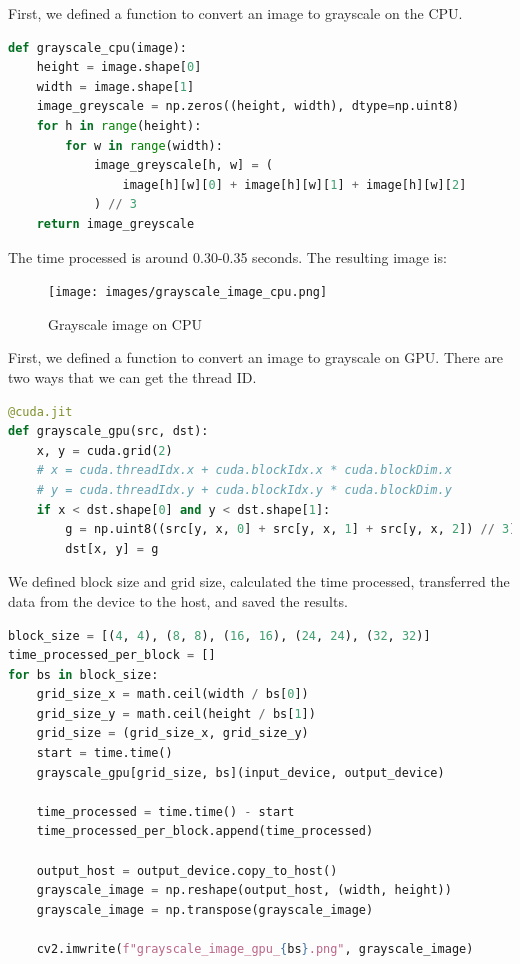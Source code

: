 \documentclass[12pt]{article}
\begin{document}
\noindent
First, we defined a function to convert an image to grayscale on the CPU. 

\begin{lstlisting}[language=Python]
def grayscale_cpu(image):
    height = image.shape[0]
    width = image.shape[1]
    image_greyscale = np.zeros((height, width), dtype=np.uint8)
    for h in range(height):
        for w in range(width):
            image_greyscale[h, w] = (
                image[h][w][0] + image[h][w][1] + image[h][w][2]
            ) // 3
    return image_greyscale
\end{lstlisting}

\noindent
The time processed is around 0.30-0.35 seconds. The resulting image is:

\begin{figure}[H]
\centering
    \texttt{[image: images/grayscale\_image\_cpu.png]}
    \caption{Grayscale image on CPU}
\end{figure}

\noindent
First, we defined a function to convert an image to grayscale on GPU. There are two ways that we can get the thread ID.

\begin{lstlisting}[language=Python]
@cuda.jit
def grayscale_gpu(src, dst):
    x, y = cuda.grid(2)
    # x = cuda.threadIdx.x + cuda.blockIdx.x * cuda.blockDim.x
    # y = cuda.threadIdx.y + cuda.blockIdx.y * cuda.blockDim.y
    if x < dst.shape[0] and y < dst.shape[1]:
        g = np.uint8((src[y, x, 0] + src[y, x, 1] + src[y, x, 2]) // 3)
        dst[x, y] = g
\end{lstlisting}

\noindent
We defined block size and grid size, calculated the time processed, transferred the data from the device to the host, and saved the results.

\begin{lstlisting}[language=Python]
block_size = [(4, 4), (8, 8), (16, 16), (24, 24), (32, 32)]
time_processed_per_block = []
for bs in block_size:
    grid_size_x = math.ceil(width / bs[0])
    grid_size_y = math.ceil(height / bs[1])
    grid_size = (grid_size_x, grid_size_y)
    start = time.time()
    grayscale_gpu[grid_size, bs](input_device, output_device)

    time_processed = time.time() - start
    time_processed_per_block.append(time_processed)

    output_host = output_device.copy_to_host()
    grayscale_image = np.reshape(output_host, (width, height))
    grayscale_image = np.transpose(grayscale_image)

    cv2.imwrite(f"grayscale_image_gpu_{bs}.png", grayscale_image)
\end{lstlisting}
\end{document}
